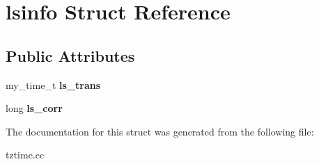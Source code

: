 \hypertarget{structlsinfo}{}\section{lsinfo Struct Reference}
\label{structlsinfo}
\subsection*{Public Attributes}
\begin{DoxyCompactItemize}
\item 
\mbox{\label{structlsinfo_abdb84b6529d25e7c70cf35d016bd16ae}} 
my\+\_\+time\+\_\+t {\bfseries ls\+\_\+trans}
\item 
\mbox{\label{structlsinfo_a9db4b2f2da8cdf2d3f0815509fef5eb7}} 
long {\bfseries ls\+\_\+corr}
\end{DoxyCompactItemize}


The documentation for this struct was generated from the following file\+:\begin{DoxyCompactItemize}
\item 
tztime.\+cc\end{DoxyCompactItemize}
